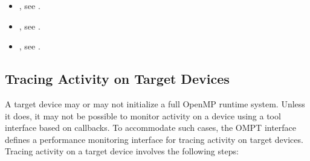 \begin{itemize}
\begin{comment}
\item \code{ompt\_callback\_worksharing}, see \specref
\item \code{ompt\_callback\_master}, see \specref
\item \code{ompt\_callback\_target\_data\_map}, see \specref
\item \code{ompt\_callback\_sync\_region}, see \specref
\item \code{ompt\_callback\_init\_lock}, see \specref
\item \code{ompt\_callback\_destroy\_lock}, see \specref
\item \code{ompt\_callback\_mutex\_acquire}, see \specref
\item \code{ompt\_callback\_mutex\_acquired}, see \specref
\item \code{ompt\_callback\_nested\_lock}, see ...
\end{comment}
\item {}, see .
\item {}, see .
\item {}, see .
\end{itemize}


\subsection{Tracing Activity on Target Devices}
\label{sec:tracing-device-activity}

A target device may or may not initialize a full OpenMP runtime system.
Unless it does, it may not be possible to monitor activity 
on a device using a tool interface based on callbacks.
To accommodate such cases, the OMPT interface defines 
a performance monitoring interface for tracing activity on target
devices. Tracing activity on a target device involves the following
steps:

